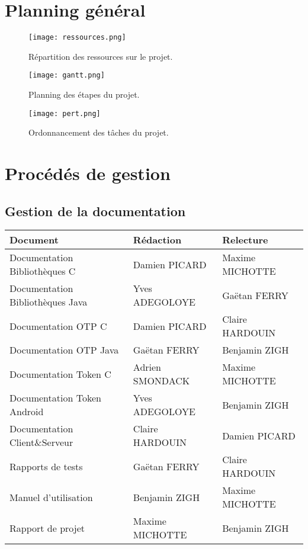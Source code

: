 \documentclass{../../res/univ-projet}
\begin{document}
\newpage
\section{Planning général}
	\begin{figure}[h]
	\texttt{[image: ressources.png]}
	\caption{Répartition des ressources sur le projet.}
	\end{figure}
	\begin{figure}[h]
	\texttt{[image: gantt.png]}
	\caption{Planning des étapes du projet.}
	\end{figure}

	\begin{figure}[h]
	\texttt{[image: pert.png]}
	\caption{Ordonnancement des tâches du projet.}
	\end{figure}

	\newpage
\section{Procédés de gestion}
	\subsection{Gestion de la documentation}
		\begin{tabular}{|l|l|l|}
			\hline
			Document & Rédaction & Relecture \\
			\hline
			Documentation Bibliothèques C & Damien PICARD & Maxime MICHOTTE\\
			Documentation Bibliothèques Java & Yves ADEGOLOYE & Gaëtan FERRY\\
			Documentation OTP C & Damien PICARD & Claire HARDOUIN\\
			Documentation OTP Java & Gaëtan FERRY & Benjamin ZIGH \\
			Documentation Token C & Adrien SMONDACK & Maxime MICHOTTE\\
			Documentation Token Android & Yves ADEGOLOYE & Benjamin ZIGH\\
			Documentation Client\&Serveur & Claire HARDOUIN & Damien PICARD \\
			Rapports de tests & Gaëtan FERRY & Claire HARDOUIN \\
			Manuel d'utilisation & Benjamin ZIGH & Maxime MICHOTTE \\
			Rapport de projet & Maxime MICHOTTE & Benjamin ZIGH \\
			\hline 
		\end{tabular}
\end{document}
